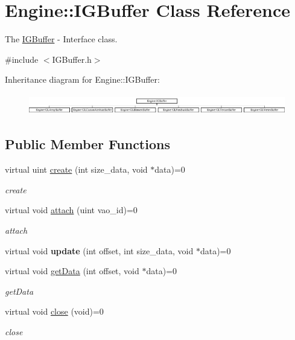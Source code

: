 \hypertarget{classEngine_1_1IGBuffer}{}\section{Engine\+:\+:I\+G\+Buffer Class Reference}
\label{classEngine_1_1IGBuffer}


The \hyperlink{classEngine_1_1IGBuffer}{I\+G\+Buffer} -\/ Interface class.  




{\ttfamily \#include $<$I\+G\+Buffer.\+h$>$}

Inheritance diagram for Engine\+:\+:I\+G\+Buffer\+:\begin{figure}[H]
\begin{center}
\leavevmode
\includegraphics[height=0.915033cm]{classEngine_1_1IGBuffer}
\end{center}
\end{figure}
\subsection*{Public Member Functions}
\begin{DoxyCompactItemize}
\item 
virtual uint \hyperlink{classEngine_1_1IGBuffer_a6afbd1651d2c92fcec584e8d3ef1c32b}{create} (int size\+\_\+data, void $\ast$data)=0
\begin{DoxyCompactList}\small\item\em create \end{DoxyCompactList}\item 
virtual void \hyperlink{classEngine_1_1IGBuffer_a4d4186068930b5d161a52d2fa8afad02}{attach} (uint vao\+\_\+id)=0
\begin{DoxyCompactList}\small\item\em attach \end{DoxyCompactList}\item 
\hypertarget{classEngine_1_1IGBuffer_a84ea7b6d09875a37b6ac9adb7aab6c30}{}virtual void {\bfseries update} (int offset, int size\+\_\+data, void $\ast$data)=0\label{classEngine_1_1IGBuffer_a84ea7b6d09875a37b6ac9adb7aab6c30}

\item 
virtual void \hyperlink{classEngine_1_1IGBuffer_a8ad52dc670797d72aabf99033d20b220}{get\+Data} (int offset, void $\ast$data)=0
\begin{DoxyCompactList}\small\item\em get\+Data \end{DoxyCompactList}\item 
virtual void \hyperlink{classEngine_1_1IGBuffer_a8473523f8cf850708f54859848f4234e}{close} (void)=0
\begin{DoxyCompactList}\small\item\em close \end{DoxyCompactList}\end{DoxyCompactItemize}
